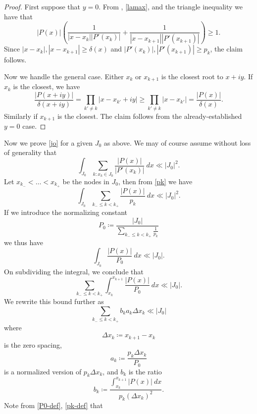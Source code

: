 \documentclass[12pt]{amsart}
\begin{document}
\begin{proof}
First suppose that $y=0$.  From , \eqref{lamax}, and the triangle inequality we have that
$$ |P(x)| \left( \frac{1}{|x-x_k| |P'(x_k)|} + \frac{1}{|x-x_{k+1}| |P'(x_{k+1})|}  \right) \geq 1.$$
Since $|x-x_k|, |x-x_{k+1}| \geq \delta(x)$ and $|P'(x_k)|, |P'(x_{k+1})| \geq p_k$, the claim follows.

Now we handle the general case.  Either $x_k$ or $x_{k+1}$ is the closest root to $x+iy$.  If $x_k$ is the closest, we have
$$ \frac{|P(x+iy)|}{\delta(x+iy)} = \prod_{k' \neq k} |x-x_{k'}+iy| \geq \prod_{k' \neq k} |x-x_{k'}| = \frac{|P(x)|}{\delta(x)}.$$
Similarly if $x_{k+1}$ is the closest. The claim follows from the already-established $y=0$ case.
\end{proof}

Now we prove \eqref{jo} for a given $J_0$ as above.  We may of course assume without loss of generality that
$$\int_{J_0} \sum_{k: x_k \in J_0} \frac{|P(x)|}{|P'(x_k)|}\ dx \ll |J_0|^2.$$
Let $x_{k_-} < \dots < x_{k_+}$ be the nodes in $J_0$, then from \eqref{pk} we have
$$\int_{J_0} \sum_{k_- \leq k < k_+} \frac{|P(x)|}{p_k}\ dx \ll |J_0|^2.$$
If we introduce the normalizing constant
\begin{equation}\label{P0-def}
P_0 \coloneqq \frac{|J_0|}{\sum_{k_- \leq k < k_+} \frac{1}{p_k}}
\end{equation}
we thus have
$$ \int_{J_0} \frac{|P(x)|}{P_0}\ dx \ll |J_0|.$$
On subdividing the integral, we conclude that
\begin{equation}\label{subdivide-2}
\sum_{k_- \leq k < k_+} \int_{x_{k}}^{x_{k+1}} \frac{|P(x)|}{P_0}\ dx \ll |J_0|.
\end{equation}
We rewrite this bound further as
\begin{equation}\label{p-2}
    \sum_{k_- \leq k < k_+} b_k a_k \Delta x_k \ll |J_0|
\end{equation}
where
\begin{equation}\label{deltaxk-def}
    \Delta x_k \coloneqq x_{k+1} - x_k
\end{equation}
is the zero spacing,
\begin{equation}\label{pk-def}
a_k \coloneqq \frac{p_k \Delta x_k}{P_0}
\end{equation}
is a normalized version of $p_k \Delta x_k$, and $b_k$ is the ratio
\begin{equation}\label{ak-def}
b_k \coloneqq \frac{\int_{x_k}^{x_{k+1}} |P(x)|\ dx}{p_k (\Delta x_k)^2}.
\end{equation}
Note from \eqref{P0-def}, \eqref{pk-def} that
\end{document}
